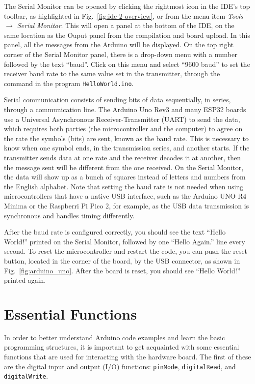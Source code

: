 The Serial Monitor can be opened by clicking the rightmost icon in the IDE's top toolbar, as highlighted in Fig.~\ref{fig:ide-2-overview}, or from the menu item \emph{Tools $\to$ Serial Monitor}.
This will open a panel at the bottom of the IDE, on the same location as the Ouput panel from the compilation and board upload.
In this panel, all the messages from the Arduino will be displayed.
On the top right corner of the Serial Monitor panel, there is a drop-down menu with a number followed by the text ``baud''.
Click on this menu and select ``9600 baud'' to set the receiver baud rate to the same value set in the transmitter, through the command  in the program \texttt{HelloWorld.ino}.

Serial communication consists of sending bits of data sequentially, in series, through a communication line.
The Arduino Uno Rev3 and many ESP32 boards use a Universal Asynchronous Receiver-Transmitter (UART) to send the data, which requires both parties (the microcontroller and the computer) to agree on the rate the symbols (bits) are sent, known as the baud rate.
This is necessary to know when one symbol ends, in the transmission series, and another starts.
If the transmitter sends data at one rate and the receiver decodes it at another, then the message sent will be different from the one received.
On the Serial Monitor, the data will show up as a bunch of squares instead of letters and numbers from the English alphabet.
Note that setting the baud rate is not needed when using microcontrollers that have a native USB interface, such as the Arduino UNO R4 Minima or the Raspberri Pi Pico 2, for example, as the USB data transmission is synchronous and handles timing differently.

After the baud rate is configured correctly, you should see the text ``Hello World!'' printed on the Serial Monitor, followed by one ``Hello Again.'' line every second.
To reset the microcontroller and restart the code, you can push the reset button, located in the corner of the board, by the USB connector, as shown in Fig.~\ref{fig:arduino_uno}.
After the board is reset, you should see ``Hello World!'' printed again.

\section{Essential Functions}
In order to better understand Arduino code examples and learn the basic programming structures, it is important to get acquainted with some essential functions that are used for interacting with the hardware board.
The first of these are the digital input and output (I/O) functions: \texttt{pinMode}, \texttt{digitalRead}, and \texttt{digitalWrite}.

